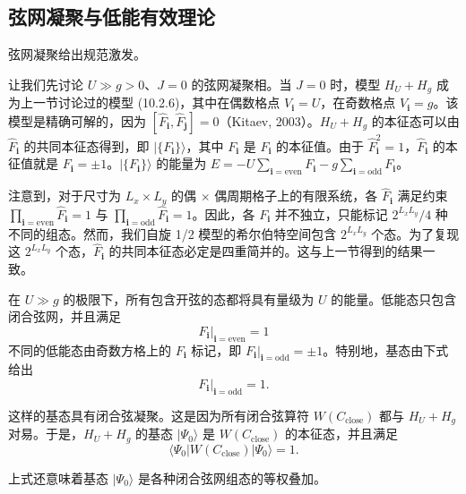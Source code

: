 \subsection{弦网凝聚与低能有效理论}

\begin{keypoints}\item 弦网凝聚给出规范激发。\end{keypoints}

让我们先讨论 $U\gg g>0$、$J=0$ 的弦网凝聚相。当 $J=0$ 时，模型 $H_U+H_g$ 成为上一节讨论过的模型 (10.2.6)，其中在偶数格点 $V_{\pmb{i}}=U$，在奇数格点 $V_{\pmb{i}}=g$。该模型是精确可解的，因为 $[\hat F_{\pmb{i}},\hat F_{\pmb{j}}]=0$（Kitaev, 2003）。$H_U+H_g$ 的本征态可以由 $\hat F_{\pmb{i}}$ 的共同本征态得到，即 $|\{F_{\pmb{i}}\}\rangle$，其中 $F_{\pmb{i}}$ 是 $\hat F_{\pmb{i}}$ 的本征值。由于 $\hat F_{\pmb{i}}^{2}=1$，$\hat F_{\pmb{i}}$ 的本征值就是 $F_{\pmb{i}}=\pm1$。$|\{F_{\pmb{i}}\}\rangle$ 的能量为 $E=-U\sum_{\pmb{i}=\mathrm{even}}F_{\pmb{i}}-g\sum_{\pmb{i}=\mathrm{odd}}F_{\pmb{i}}$。

注意到，对于尺寸为 $L_x\times L_y$ 的偶 $\times$ 偶周期格子上的有限系统，各 $\hat F_{\pmb{i}}$ 满足约束 $\prod_{\pmb{i}=\mathrm{even}}\hat F_{\pmb{i}}=1$ 与 $\prod_{\pmb{i}=\mathrm{odd}}\hat F_{\pmb{i}}=1$。因此，各 $F_{\pmb{i}}$ 并不独立，只能标记 $2^{L_xL_y}/4$ 种不同的组态。然而，我们自旋 1/2 模型的希尔伯特空间包含 $2^{L_xL_y}$ 个态。为了复现这 $2^{L_xL_y}$ 个态，$\hat F_{\pmb{i}}$ 的共同本征态必定是四重简并的。这与上一节得到的结果一致。

在 $U\gg g$ 的极限下，所有包含开弦的态都将具有量级为 $U$ 的能量。低能态只包含闭合弦网，并且满足
\begin{equation*}
F_{\pmb{i}}\big|_{\pmb{i}=\mathrm{even}}=1
\end{equation*}
不同的低能态由奇数方格上的 $F_{\pmb{i}}$ 标记，即 $F_{\pmb{i}}\big|_{\pmb{i}=\mathrm{odd}}=\pm1$。特别地，基态由下式给出
\begin{equation*}
F_{\pmb{i}}\big|_{\pmb{i}=\mathrm{odd}}=1.
\end{equation*}

这样的基态具有闭合弦凝聚。这是因为所有闭合弦算符 $W(C_{\mathrm{close}})$ 都与 $H_U+H_g$ 对易。于是，$H_U+H_g$ 的基态 $|\Psi_0\rangle$ 是 $W(C_{\mathrm{close}})$ 的本征态，并且满足
\begin{equation*}
\langle\Psi_0|W(C_{\mathrm{close}})|\Psi_0\rangle=1.
\end{equation*}

上式还意味着基态 $|\Psi_0\rangle$ 是各种闭合弦网组态的等权叠加。

